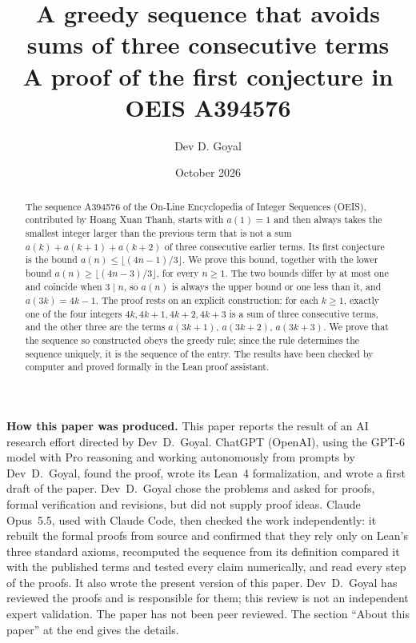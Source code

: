 \documentclass[11pt,a4paper]{article}
\title{A greedy sequence that avoids sums of three consecutive terms\\[6pt]\large A proof of the first conjecture in OEIS A394576}
\author{Dev D. Goyal}
\date{October 2026}
\theoremstyle{definition}
\theoremstyle{remark}
\begin{document}
\maketitle
\begin{abstract}
The sequence A394576 of the On-Line Encyclopedia of Integer Sequences (OEIS), contributed by Hoang Xuan Thanh, starts
with $a(1)=1$ and then always takes the smallest integer larger than the previous term that is not a sum
$a(k)+a(k+1)+a(k+2)$ of three consecutive earlier terms. Its first conjecture is the bound
$a(n)\le\lfloor(4n-1)/3\rfloor$. We prove this bound, together with the lower bound
$a(n)\ge\lfloor(4n-3)/3\rfloor$, for every $n\ge1$. The two bounds differ by at most one and coincide when $3\mid n$, so
$a(n)$ is always the upper bound or one less than it, and $a(3k)=4k-1$. The proof rests on an explicit construction: for
each $k\ge1$, exactly one of the four integers $4k,4k+1,4k+2,4k+3$ is a sum of three consecutive terms, and the other
three are the terms $a(3k+1)$, $a(3k+2)$, $a(3k+3)$. We prove that the sequence so constructed obeys the greedy rule;
since the rule determines the sequence uniquely, it is the sequence of the entry. The results have been checked by
computer and proved formally in the Lean proof assistant.
\end{abstract}
\begin{center}\begin{minipage}{0.88\linewidth}\small
\textbf{How this paper was produced.} This paper reports the result of an AI research effort directed by
Dev~D.~Goyal. ChatGPT (OpenAI), using the GPT-6 model with Pro reasoning and working autonomously from prompts by
Dev~D.~Goyal, found the proof, wrote its Lean~4 formalization, and wrote a first draft of the paper.
Dev~D.~Goyal chose the problems and asked for proofs, formal verification and revisions, but did not supply proof
ideas. Claude Opus~5.5, used with Claude Code, then checked the work independently: it rebuilt the formal proofs from
source and confirmed that they rely only on Lean's three standard axioms, recomputed the sequence from its definition
compared it with the published terms and tested every claim numerically, and read every step of the proofs. It also wrote the present
version of this paper.
Dev~D.~Goyal has reviewed the proofs and is responsible for them; this review is not an independent expert validation.
The paper has not been peer reviewed.
The section ``About this paper'' at the end gives the details.
\end{minipage}\end{center}
\end{document}
